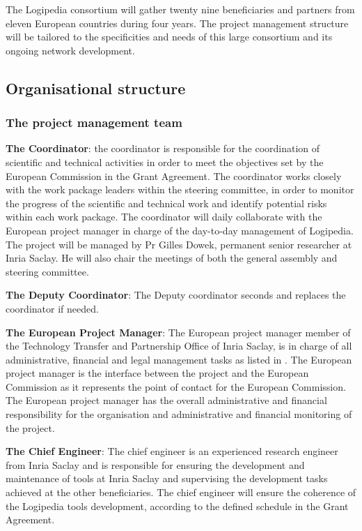 The Logipedia consortium will gather twenty nine beneficiaries and partners
from eleven European countries during four years. The project management
structure will be tailored to the specificities and needs of this
large consortium and its ongoing network development.

\subsection{Organisational structure}

\subsubsection*{The project management team}

\begin{compactitem}
\item{\bf The Coordinator}: the 
coordinator is responsible for the coordination of
scientific and technical activities in order to meet the objectives
set by the European Commission in the Grant Agreement. The 
coordinator works closely with the work package leaders
within the steering committee, in order to monitor the progress of the
scientific and technical work and identify potential risks within each
work package. The coordinator will daily
collaborate with the European project manager in charge of the
day-to-day management of Logipedia. The project will be managed by Pr
Gilles Dowek, permanent senior researcher at Inria Saclay. He will
also chair the meetings of both the general assembly and steering
committee.

\item{\bf The Deputy Coordinator}: The Deputy coordinator seconds and
replaces the coordinator if needed.

\item{\bf The European Project Manager}: The European project manager
member of the Technology Transfer and Partnership Office of Inria
Saclay, is in charge of all administrative, financial and legal
management tasks as listed in . The
European project manager is the interface between the project and the
European Commission as it represents the point of contact for the
European Commission. The European project manager has the overall
administrative and financial responsibility for the organisation and
administrative and financial monitoring of the project.

\item{\bf The Chief Engineer}: The chief engineer is an experienced
research engineer from Inria Saclay and is responsible for ensuring
the development and maintenance of tools at Inria Saclay and
supervising the development tasks achieved at the other
beneficiaries. The chief engineer will ensure the coherence of the
Logipedia tools development, according to the defined schedule in the
Grant Agreement.
\end{compactitem}

